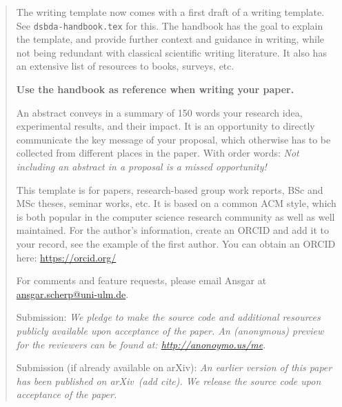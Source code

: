 \documentclass[sigconf, review, nonacm]{acmart}
\begin{document}
\begin{abstract}

\begin{tcolorbox}[title=A handbook is born!,colback=red!20]

The writing template now comes with a first draft of a writing template. 
See \texttt{dsbda-handbook.tex} for this.
The handbook has the goal to explain the template, and provide further context and guidance in writing, while not being redundant with classical scientific writing literature.
It also has an extensive list of resources to books, surveys, etc.

\textbf{Use the handbook as reference when writing your paper.}
\end{tcolorbox}

\begin{tcolorbox}[title=Abstract: How to write it]
An abstract conveys in a summary of 150 words your research idea, experimental results, and their impact. It is an opportunity to directly communicate the key message of your proposal, which otherwise has to be collected from different places in the paper. With order words: \textit{Not including an abstract in a proposal is a missed opportunity!}
\end{tcolorbox}

This template is for papers, research-based group work reports, BSc and MSc theses, seminar works, etc. 
It is based on a common ACM style, which is both popular in the computer science research community as well as well maintained.
%
For the author's information, create an ORCID and add it to your record, see the example of the first author.
You can obtain an ORCID here: \url{https://orcid.org/}


For comments and feature requests, please email Ansgar at
\href{mailto:ansgar.scherp@uni-ulm.de?subject=DSBDA-TemplateForPaper-Annotated}{ansgar.scherp@uni-ulm.de}.


Submission: \textit{We pledge to make the source code and additional resources publicly available upon acceptance of the paper.
An (anonymous) preview for the reviewers can be found at:
\url{http://anonoymo.us/me}.}

Submission (if already available on arXiv): \textit{An earlier version of this paper has been published on arXiv~(add cite). %
We release the source code upon acceptance of the paper.}


\end{abstract}
\end{document}
